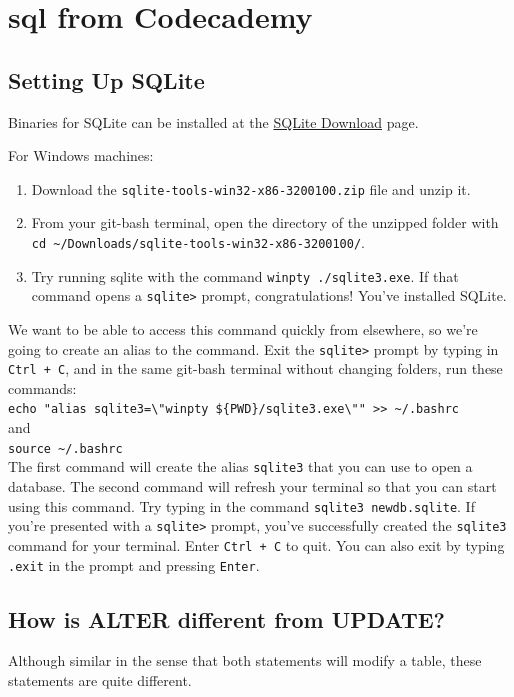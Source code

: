 \documentclass[a4paper, 12pt]{article}
\begin{document}
\section{sql from Codecademy}
\subsection{Setting Up SQLite}
Binaries for SQLite can be installed at the \href{https://www.sqlite.org/download.html}{SQLite Download} page.

For Windows machines:
\begin{enumerate}
\item Download the \verb|sqlite-tools-win32-x86-3200100.zip| file and unzip it.

\item From your git-bash terminal, open the directory of the unzipped folder with \verb|cd ~/Downloads/sqlite-tools-win32-x86-3200100/|.

\item Try running sqlite with the command \verb|winpty ./sqlite3.exe|. If that command opens a \verb|sqlite>| prompt, congratulations! You've installed SQLite.

\end{enumerate}
We want to be able to access this command quickly from elsewhere, so we're going to create an alias to the command. Exit the \verb|sqlite>| prompt by typing in \verb|Ctrl + C|, and in the same git-bash terminal without changing folders, run these commands:\\
\verb|echo "alias sqlite3=\"winpty ${PWD}/sqlite3.exe\"" >> ~/.bashrc|\\
and\\
\verb|source ~/.bashrc|\\
The first command will create the alias \verb|sqlite3| that you can use to open a database. The second command will refresh your terminal so that you can start using this command. Try typing in the command \verb|sqlite3 newdb.sqlite|. If you're presented with a \verb|sqlite>| prompt, you've successfully created the \verb|sqlite3| command for your terminal. Enter \verb|Ctrl + C| to quit. You can also exit by typing \verb|.exit| in the prompt and pressing \verb|Enter|.

\subsection{How is ALTER different from UPDATE?}
Although similar in the sense that both statements will modify a table, these statements are quite different.
\end{document}
